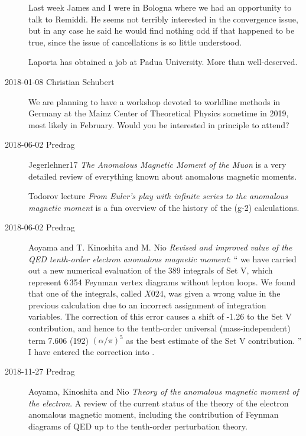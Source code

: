 \begin{description}
Last week James and I were in Bologna where we had an opportunity to talk
to Remiddi. He seems not terribly interested in the convergence issue,
but in any case he said he would find nothing odd if that happened to be
true, since the issue of cancellations is so little understood.

Laporta has obtained a job at Padua University. More than well-deserved.

\item[2018-01-08 Christian Schubert]
We are planning to have a workshop devoted to worldline methods in
Germany at the Mainz Center of Theoretical Physics sometime in 2019, most
likely in February. Would you be interested in principle to attend?

\item[2018-06-02 Predrag]
Jegerlehner17
{\em The Anomalous Magnetic Moment of the Muon}
is a very detailed review of everything known about anomalous
magnetic moments.

Todorov lecture {\em From {Euler}'s play with infinite series to
the anomalous magnetic moment} is a fun overview of the history of the (g-2)
calculations.

\item[2018-06-02 Predrag]
Aoyama and T. Kinoshita and M. Nio {\em Revised and improved value
of the {QED} tenth-order electron anomalous magnetic moment}:
``
we have carried out a new numerical evaluation of the 389 integrals of Set V,
which represent 6\,354 Feynman vertex diagrams without lepton loops. We found
that one of the integrals, called $X024$, was given a wrong value in the
previous calculation due to an incorrect assignment of integration variables.
The correction of this error causes a shift of -1.26 to the Set V contribution,
and hence to the tenth-order universal (mass-independent) term 7.606
(192) $(\alpha/{\pi})^5$ as the best estimate of the Set V contribution.
''
I have entered the correction into .

\item[2018-11-27 Predrag]
Aoyama, Kinoshita and Nio
{\em Theory of the anomalous magnetic moment of the electron}.
A review of the current status of the theory of the electron anomalous
magnetic moment, including the contribution of Feynman diagrams of QED up
to the tenth-order perturbation theory.


\end{description}
